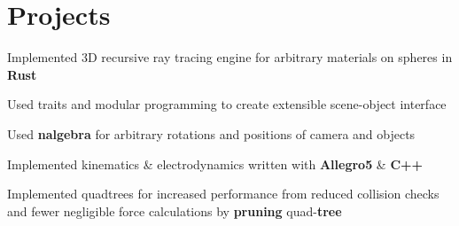 \documentclass[]{chandan-cv}
\begin{document}
\begin{minipage}[t]{0.75\textwidth}

\section{Projects}

\descript{ }
\location{ }
\begin{tightemize}
	\item Implemented 3D recursive ray tracing engine for arbitrary materials on spheres in \textbf{Rust}
	\item Used traits and modular programming to create extensible scene-object interface
	\item Used \textbf{nalgebra} for arbitrary rotations and positions of camera and objects 
\end{tightemize}
\sectionsep

\descript{ }
\location{ }
\begin{tightemize}
	\item Implemented kinematics \& electrodynamics written with \textbf{Allegro5} \& \textbf{C++}
	\item Implemented quadtrees for increased performance from reduced collision checks and fewer 
	negligible force calculations by \textbf{pruning} quad-\textbf{tree}
\end{tightemize}
\sectionsep





\end{minipage}
\end{document}

